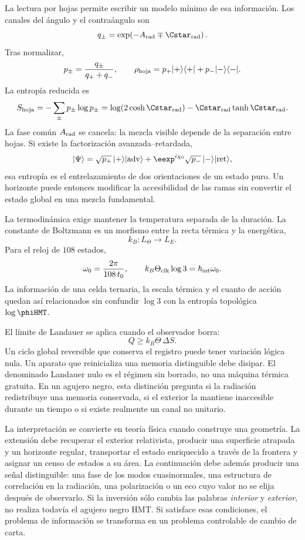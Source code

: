 La lectura por hojas permite escribir un modelo mínimo de esa información. Los
canales del ángulo y el contraángulo son
\[
 q_\pm
 =
 \exp\!\left(-A_{\rm rad}\mp \Cstar_{\rm rad}\right).
\]
Tras normalizar,
\[
 p_\pm=\frac{q_\pm}{q_++q_-},
\qquad
 \rho_{\rm hoja}
 =
 p_+|+\rangle\langle+|
 +
 p_-|-\rangle\langle-|.
\]
La entropía reducida es
\[
 S_{\rm hoja}
 =
 -\sum_{\pm}p_\pm\log p_\pm
 =
 \log\!\left(2\cosh\Cstar_{\rm rad}\right)
 -
 \Cstar_{\rm rad}\tanh\Cstar_{\rm rad}.
\]
La fase común \(A_{\rm rad}\) se cancela: la mezcla visible depende de la separación
entre hojas. Si existe la factorización avanzada--retardada,
\[
 |\Psi\rangle
 =
 \sqrt{p_+}\,|+\rangle|\mathrm{adv}\rangle
 +
 \eexp^{i\chi_0}
 \sqrt{p_-}\,|-\rangle|\mathrm{ret}\rangle,
\]
esa entropía es el entrelazamiento de dos orientaciones de un estado puro. Un
horizonte puede entonces modificar la accesibilidad de las ramas sin convertir el
estado global en una mezcla fundamental.

La termodinámica exige mantener la temperatura separada de la duración. La
constante de Boltzmann es un morfismo entre la recta térmica y la energética,
\[
 k_B:L_\Theta\longrightarrow L_E.
\]
Para el reloj de \(108\) estados,
\[
 \omega_0=\frac{2\pi}{108\,t_0},
\qquad
 k_B\Theta_{\rm clk}\log3
 =
 \hbar_{\rm int}\omega_0.
\]
La información de una celda ternaria, la escala térmica y el cuanto de acción quedan
así relacionados sin confundir \(\log3\) con la entropía topológica
\(\log\phiHMT\).

El límite de Landauer se aplica cuando el observador borra:
\[
 Q\geq k_B\Theta\,\Delta S.
\]
Un ciclo global reversible que conserva el registro puede tener variación lógica
nula. Un aparato que reinicializa una memoria distinguible debe disipar. El
denominado Landauer nulo es el régimen sin borrado, no una máquina térmica gratuita.
En un agujero negro, esta distinción pregunta si la radiación redistribuye una
memoria conservada, si el exterior la mantiene inaccesible durante un tiempo o si
existe realmente un canal no unitario.

La interpretación se convierte en teoría física cuando construye una geometría.
La extensión debe recuperar el exterior relativista, producir una superficie
atrapada y un horizonte regular, transportar el estado enriquecido a través de la
frontera y asignar un censo de estados a su área. La continuación debe además
producir una señal distinguible: una fase de los modos cuasinormales, una estructura
de correlación en la radiación, una polarización o un eco cuyo valor no se elija
después de observarlo. Si la inversión sólo cambia las palabras \emph{interior} y
\emph{exterior}, no realiza todavía el agujero negro HMT. Si satisface esas
condiciones, el problema de información se transforma en un problema controlable de
cambio de carta.


